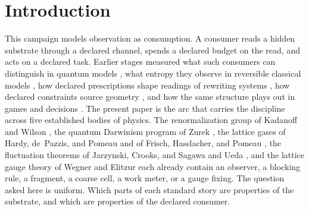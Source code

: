 \documentclass[aps,pre,reprint,nofootinbib,floatfix]{revtex4-2}
\begin{document}
\begin{abstract}
holds with the acting controller's information and fails with a
bystander's.  In gauge theory, three routes to a Wilson loop agree
to every printed digit, every gauge-fixed observer's link reading
equals a gauge-invariant loop selected by its declared fixing,
breaking the constraint is first-order visible in the fiber sector
while the invariant sector responds at fourth order with measured
slope 4.000003, and a coupled matter field has no bare identity
apart from the observer's fiber coordinates.  Six of the
twenty-seven runs failed their declared bars.  Each failure is
recorded with its design error named, and each correction was run
as a separate registration.  Nothing in this paper is a claim about
any laboratory system.
\end{abstract}

\maketitle

\section{Introduction}
\label{sec:intro}

This campaign models observation as consumption.  A consumer reads a
hidden substrate through a declared channel, spends a declared
budget on the read, and acts on a declared task.  Earlier stages
measured what such consumers can distinguish in quantum models
\cite{QuantumPaper}, what entropy they observe in reversible
classical models
\cite{SourcesPaper}, how declared prescriptions shape readings of
rewriting systems \cite{WMPaper}, how declared constraints source
geometry \cite{RadiativePaper}, and how the same structure plays
out in games and decisions \cite{GamesPaper}.  The present paper is
the arc that carries the discipline across five established bodies
of physics.  The renormalization group of Kadanoff and Wilson
\cite{Kadanoff1966, Wilson1971, Wilson1975}, the quantum Darwinism
program of Zurek \cite{Zurek2003, Zurek2009}, the lattice gases of
Hardy, de~Pazzis, and Pomeau and of Frisch, Hasslacher, and Pomeau
\cite{HPP1976, FHP1986}, the fluctuation theorems of Jarzynski,
Crooks, and Sagawa and Ueda \cite{Jarzynski1997, Crooks1999,
SagawaUeda2010}, and the lattice gauge theory of Wegner and Elitzur
\cite{Wegner1971, Elitzur1975} each already contain an observer,
a blocking rule, a fragment, a coarse cell, a work meter, or a
gauge fixing.  The question asked here is uniform.  Which parts of
each standard story are properties of the substrate, and which are
properties of the declared consumer.
\end{document}

